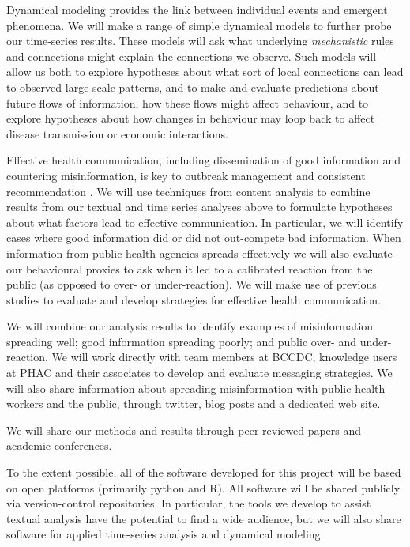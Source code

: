 Dynamical modeling provides the link between individual events and emergent phenomena. 
We will make a range of simple dynamical models to further probe our time-series results.
These models will ask what underlying \emph{mechanistic} rules and connections might explain the connections we observe. 
Such models will allow us both to explore hypotheses about what sort of local connections can lead to observed large-scale patterns, and to make and evaluate predictions about future flows of information, how these flows might affect behaviour, and to explore hypotheses about how changes in behaviour may loop back to affect disease transmission or economic interactions. 


Effective health communication, including dissemination of good information and countering misinformation, is key to outbreak management \citep{SongSong17} and consistent recommendation \citep{OhlrSugg18,SongSong17}.
We will use techniques from content analysis \citep{Finf13 ,Mayr14} to combine results from our textual and time series analyses above to formulate hypotheses about what factors lead to effective communication. In particular, we will identify cases where good information did or did not out-compete bad information. When information from public-health agencies spreads effectively we will also evaluate our behavioural proxies to ask when it led to a calibrated reaction from the public (as opposed to over- or under-reaction).
We will make use of previous studies to evaluate \citep{Ding14,FarmSher18,NowaShee15,Tam18} and develop \citep{BekaBigm18, ShenShee15, SongSong17} strategies for effective health communication.


 We will combine our analysis results to identify examples of misinformation spreading well; good information spreading poorly; and public over- and under-reaction. We will work directly with team members at BCCDC, knowledge users at PHAC and their associates to develop and evaluate messaging strategies. We will also share information about spreading misinformation with public-health workers and the public, through twitter, blog posts and a dedicated web site. 

 We will share our methods and results through peer-reviewed papers and academic conferences. 

 To the extent possible, all of the software developed for this project will be based on open platforms (primarily python and R). All software will be shared publicly via version-control repositories. In particular, the tools we develop to assist textual analysis have the potential to find a wide audience, but we will also share software for applied time-series analysis and dynamical modeling.

